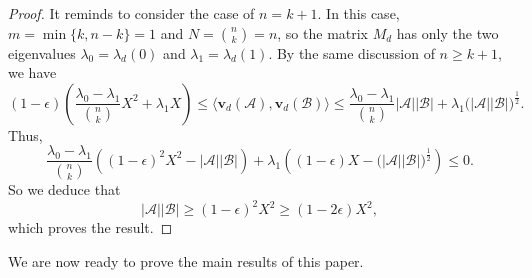 \documentclass[10pt,a4paper]{amsart}
\numberwithin{equation}{section}
\def\A{\mathcal{A}}
\def\B{\mathcal{B}}
\begin{document}
\begin{proof}
It reminds to consider the case of $n=k+1$.
In this case, $m=\min\{k,n-k\}=1$ and $N=\binom{n}{k}=n$, so the matrix $M_d$ has only the two eigenvalues $\lambda_0=\lambda_d(0)$ and $\lambda_1=\lambda_d(1)$.
By the same discussion of $n\geq k+1$, we have
$$
(1-\epsilon)\left( \frac{\lambda _0-\lambda _1}{ \binom{n}{k} } X^2
+\lambda _1  X\right)
\leq
\big\langle \mathbf{v}_d(\A),\mathbf{v}_d(\B)\big\rangle
\leq  \frac{\lambda_0-\lambda_1}{\binom{n}{k}} {|\mathcal A||\mathcal B|} +\lambda_1 \big(|\A||\B|\big)^{\frac{1}{2}}.
$$
Thus,
$$\frac{\lambda _0-\lambda _1}{ \binom{n}{k} }
\left((1-\epsilon)^2 X^2- |\A||\B|\right)
+\lambda _1 \left((1-\epsilon) X-\big(|\A||\B|\big)^{\frac{1}{2}}\right)\leq 0.$$
So we deduce that
$$|\A||\B|\geq (1-\epsilon)^2X^2
\geq(1-2\epsilon) X^2,$$
which proves the result.
\end{proof}


We are now ready to prove the main results of this paper.
\end{document}
